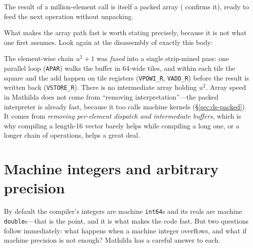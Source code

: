 
\noindent The result of a million-element call is itself a packed array
( confirms it), ready to feed the next operation without unpacking.

What makes the array path fast is worth stating precisely, because it is not what
one first assumes. Look again at the disassembly of exactly this body:


\noindent The element-wise chain \(u^2 + 1\) was \emph{fused}
into a single strip-mined pass: one parallel loop (\texttt{APAR}) walks the buffer
in 64-wide tiles, and within each tile the square and the add happen on tile
registers (\texttt{VPOWI\_R}, \texttt{VADD\_R}) before the result is written back
(\texttt{VSTORE\_R}). There is no intermediate array holding \(u^2\). Array speed
in Mathilda does not come from ``removing interpretation''---the packed
interpreter is already fast, because it too calls machine kernels
(\S\ref{sec:ds-packed}). It comes from \emph{removing per-element dispatch and
intermediate buffers}, which is why compiling a length-16 vector barely helps
while compiling a long one, or a longer chain of operations, helps a great deal.


\section{Machine integers and arbitrary precision}
\label{sec:compile-precision}

By default the compiler's integers are machine \texttt{int64}s and its reals are
machine \texttt{double}s---that is the point, and it is what makes the code fast.
But two questions follow immediately: what happens when a machine integer
overflows, and what if machine precision is not enough? Mathilda has a careful
answer to each.

